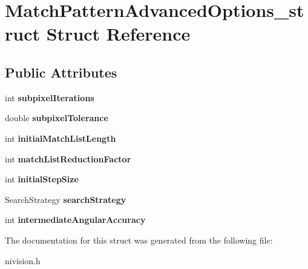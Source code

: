 \hypertarget{structMatchPatternAdvancedOptions__struct}{
\section{MatchPatternAdvancedOptions\_\-struct Struct Reference}
\label{structMatchPatternAdvancedOptions__struct}
}
\subsection*{Public Attributes}
\begin{DoxyCompactItemize}
\item 
\hypertarget{structMatchPatternAdvancedOptions__struct_a820ddf92365b9647996ab75e2e20a4ad}{
int {\bfseries subpixelIterations}}
\label{structMatchPatternAdvancedOptions__struct_a820ddf92365b9647996ab75e2e20a4ad}

\item 
\hypertarget{structMatchPatternAdvancedOptions__struct_a2768b4709bf23cc9b64a8c36b09f7e4b}{
double {\bfseries subpixelTolerance}}
\label{structMatchPatternAdvancedOptions__struct_a2768b4709bf23cc9b64a8c36b09f7e4b}

\item 
\hypertarget{structMatchPatternAdvancedOptions__struct_a5e67431cbc4705ad7e8c7088f6c12286}{
int {\bfseries initialMatchListLength}}
\label{structMatchPatternAdvancedOptions__struct_a5e67431cbc4705ad7e8c7088f6c12286}

\item 
\hypertarget{structMatchPatternAdvancedOptions__struct_a2a4992bcee08739ad5c591d7eda4b2b6}{
int {\bfseries matchListReductionFactor}}
\label{structMatchPatternAdvancedOptions__struct_a2a4992bcee08739ad5c591d7eda4b2b6}

\item 
\hypertarget{structMatchPatternAdvancedOptions__struct_ad850848fd4b69d0e013cd2e7f46c9e6f}{
int {\bfseries initialStepSize}}
\label{structMatchPatternAdvancedOptions__struct_ad850848fd4b69d0e013cd2e7f46c9e6f}

\item 
\hypertarget{structMatchPatternAdvancedOptions__struct_a472f4644ad1c1b4aca38b4ce3fbc217e}{
SearchStrategy {\bfseries searchStrategy}}
\label{structMatchPatternAdvancedOptions__struct_a472f4644ad1c1b4aca38b4ce3fbc217e}

\item 
\hypertarget{structMatchPatternAdvancedOptions__struct_ac38aded825e2a43c01ad72171311b652}{
int {\bfseries intermediateAngularAccuracy}}
\label{structMatchPatternAdvancedOptions__struct_ac38aded825e2a43c01ad72171311b652}

\end{DoxyCompactItemize}


The documentation for this struct was generated from the following file:\begin{DoxyCompactItemize}
\item 
nivision.h\end{DoxyCompactItemize}
